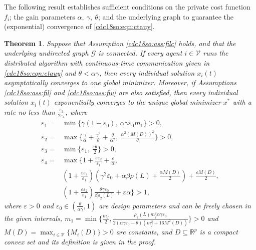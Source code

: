 \documentclass[letterpaper, 10 pt, conference]{ieeeconf}  %
\newtheorem{theorem}{Theorem}
\begin{document}
The following result establishes sufficient conditions on the private cost function $f_i$; the gain parameters $\alpha,~\gamma,~\theta$; and the underlying graph to guarantee the (exponential) convergence of \eqref{cdc18so:eqn:ctauy}. %
\begin{theorem}\label{cdc18so:theorem}
Suppose that Assumption \ref{cdc18so:ass:filc}  holds, and that the underlying undirected graph $\mathcal{G}$ is connected. If every agent $i\in\mathcal{V}$ runs the distributed algorithm with continuous-time communication given in \eqref{cdc18so:eqn:ctauy} and $\theta<\alpha\gamma$, then every individual solution $x_i(t)$ asymptotically converges to one global minimizer. Moreover, if Assumptions \ref{cdc18so:ass:fil} and  \ref{cdc18so:ass:fiu} are also satisfied, then every individual solution $x_i(t)$ exponentially converges to the unique global minimizer $x^*$ with a rate no less than $\frac{\varepsilon_3}{2\varepsilon_4}$, where
\begin{align}
\varepsilon_1=&\min\{\gamma(1-\varepsilon_0),~\alpha\gamma\varepsilon_0m_1\}>0,\label{cdc18so:varepsilon1}\\
\varepsilon_2=&\max\Big\{\frac{\gamma}{\alpha}+\frac{\gamma^2}{\theta}
+\frac{\theta}{\alpha^2},~\frac{\alpha^2(M(D))^2}{\theta }\Big\}>0,\label{cdc18so:varepsilon2}\\
\varepsilon_3=&\min\Big\{\varepsilon_1,~\frac{\varepsilon\theta }{2}\Big\}>0,
\label{cdc18so:varepsilon3}\\
\varepsilon_4=&
\max\Big\{1+\frac{\varepsilon\varepsilon_2}{\varepsilon_1}+\frac{\varepsilon}{\alpha},\nonumber\\
&(1+\frac{\varepsilon\varepsilon_2}{\varepsilon_1})(\gamma^2\varepsilon_0+
\alpha\beta\rho(L)+\frac{\alpha M(D)}{2})+\frac{\varepsilon M(D)}{2},\nonumber\\
&(1+\frac{\varepsilon\varepsilon_2}{\varepsilon_1})
\frac{\theta\gamma\varepsilon_0}{\beta\rho_2(L)}+\varepsilon\alpha\Big\}>1,
\label{cdc18so:varepsilon4}
\end{align}
where $\varepsilon>0$ and $\varepsilon_0\in(\frac{\theta}{\alpha\gamma},1)$ are design parameters  and can be freely chosen in the given intervals, $m_1=\min\Big\{\frac{m_f}{2},\frac{\rho_2(L)m_f^2\alpha\gamma\varepsilon_0}
{2(\alpha\gamma\varepsilon_0-\theta)(m^2_f+16M^2(D))}\Big\}>0$ and $M(D)=\max_{i\in \mathcal{V}}\{M_i(D)\}>0$ are constants, and $D\subseteq\mathbb{R}^p$ is a compact convex set and its definition is given in the proof.
\end{theorem}
\end{document}
